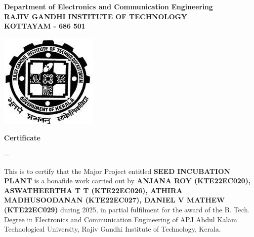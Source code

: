 \begin{center}

    {
        \large \bfseries
        Department of Electronics and Communication Engineering \\
        \vspace{10pt}
        RAJIV GANDHI INSTITUTE OF TECHNOLOGY \\
        \vspace{5pt}
        KOTTAYAM - 686 501 \\
        \vspace{5pt}
    }

    \vspace{50pt}

    \includegraphics {clg_logo.jpg}

    \vspace{40pt}

    {
        \huge \bfseries
        Certificate
    }

    \vspace{40pt}

    \begin{minipage} {0.9\textwidth}

        \emergencystretch=\maxdimen

        {
            \large
            This is to certify that the Major Project entitled
            \textbf{SEED INCUBATION PLANT}
            is a bonafide work carried out by
            {\small\textbf{
                ANJANA ROY (KTE22EC020),
                ASWATHEERTHA T T (KTE22EC026),
                ATHIRA MADHUSOODANAN (KTE22EC027),
                DANIEL V MATHEW (KTE22EC029)
            }}
            during 2025, in partial
            fulfilment for the award of the B. Tech. Degree in Electronics and
            Communication Engineering of APJ Abdul Kalam Technological
            University, Rajiv Gandhi Institute of Technology, Kerala.
        }
    \end{minipage}


\end{center}

